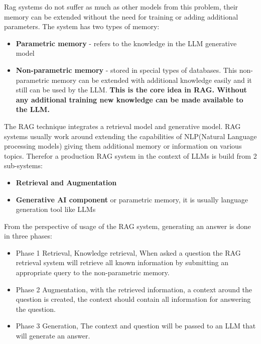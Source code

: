 \documentclass{wseas}
\begin{document}
Rag systems do not suffer as much as other models from this problem,
their memory can be extended without the need for training or adding
additional parameters. The system has two types of memory:

\begin{itemize}
\item
  \textbf{Parametric memory} - refers to the knowledge in the LLM
  generative model
\item
  \textbf{Non-parametric memory} - stored in special types of databases.
  This non-parametric memory can be extended with additional knowledge
  easily and it still can be used by the LLM. \textbf{This is the core
  idea in RAG. Without any additional training new knowledge can be made
  available to the LLM.}
\end{itemize}

The RAG technique integrates a retrieval model and generative model. RAG
systems usually work around extending the capabilities of NLP(Natural
Language processing models) giving them additional memory or information
on various topics. Therefor a production RAG system in the context of
LLMs is build from 2 sub-systems:

\begin{itemize}
\item
  \textbf{Retrieval and Augmentation}
\item
  \textbf{Generative AI component} or parametric memory, it is usually
  language generation tool like LLMs
\end{itemize}


From the perspective of usage of the RAG system, generating an answer is
done in three phases:

\begin{itemize}
\item
  Phase 1 Retrieval, Knowledge retrieval, When asked a question the RAG
  retrieval system will retrieve all known information by submitting an
  appropriate query to the non-parametric memory.
\item
  Phase 2 Augmentation, with the retrieved information, a context around
  the question is created, the context should contain all information
  for answering the question.
\item
  Phase 3 Generation, The context and question will be passed to an LLM
  that will generate an answer.
\end{itemize}
\end{document}
